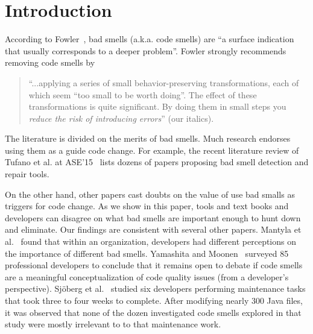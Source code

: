 \documentclass{sig-alternate}
\begin{document}
\section{Introduction}






\noindent
According to   Fowler~\cite{fowler99}, bad smells (a.k.a. code smells)
are ``a surface indication that usually corresponds to a deeper problem''.
Fowler strongly recommends   removing   code smells   by
\begin{quote}
``...applying a series of small behavior-preserving transformations, each 
of which seem ``too small to be worth doing''. 
The  effect of   these transformations is quite significant. By doing them in small steps you {\em reduce the risk of introducing errors}'' (our italics).
\end{quote}
The literature is divided on the merits of bad smells.
Much research  endorses using them as a guide
code change. For example,
the recent literature review of Tufano et al. at ASE'15~\cite{Tufano2015}  
lists dozens of  
papers proposing bad smell detection and repair tools. 

On the other hand, other papers cast doubts on the value of use bad smalls
as triggers for code change.
As we show in this paper,  
 tools and text books and developers can disagree on what bad smells
are important enough to hunt down and eliminate. Our findings
are consistent with several other papers.
Mantyla et al.~\cite{Mantyla2004} found that within an organization,
 developers had different perceptions on the importance of different
 bad smells.    Yamashita  and Moonen~\cite{Yamashita2013}
 surveyed 85 professional developers to conclude that it remains
 open to debate if code smells are a meaningful conceptualization  of code quality issues (from a developer's perspective). 
 Sj\"oberg et al.~\cite{Sjoberg2013} studied six developers 
 performing maintenance tasks that took three to four weeks to complete. 
 After modifying nearly 300 Java files, it was observed
 that none of the dozen investigated code smells explored in 
 that study were mostly irrelevant to to that maintenance work.
 
\end{document}
